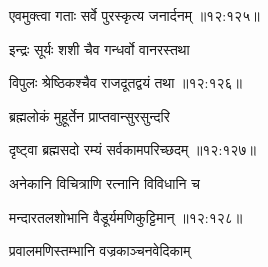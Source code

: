 
{\devanagarifont एवमुक्त्वा गताः सर्वे पुरस्कृत्य जनार्दनम् {॥१२:१२५॥} \veg\dontdisplaylinenum }%

{\devanagarifont इन्द्रः सूर्यः शशी चैव गन्धर्वो वानरस्तथा \thinspace{\dandab} \dontdisplaylinenum }%


{\devanagarifont विपुलः श्रेष्ठिकश्चैव राजदूतद्वयं तथा {॥१२:१२६॥} \veg\dontdisplaylinenum }%

{\devanagarifont ब्रह्मलोकं मुहूर्तेन प्राप्तवान्सुरसुन्दरि \thinspace{\dandab} \dontdisplaylinenum }%


{\devanagarifont दृष्ट्वा ब्रह्मसदो रम्यं सर्वकामपरिच्छदम् {॥१२:१२७॥} \veg\dontdisplaylinenum }%

{\devanagarifont अनेकानि विचित्राणि रत्नानि विविधानि च \thinspace{\dandab} \dontdisplaylinenum }%
 

{\devanagarifont मन्दारतलशोभानि वैडूर्यमणिकुट्टिमान् {॥१२:१२८॥} \veg\dontdisplaylinenum }%

{\devanagarifont प्रवालमणिस्तम्भानि वज्रकाञ्चनवेदिकाम् \thinspace{\dandab} \dontdisplaylinenum }%

